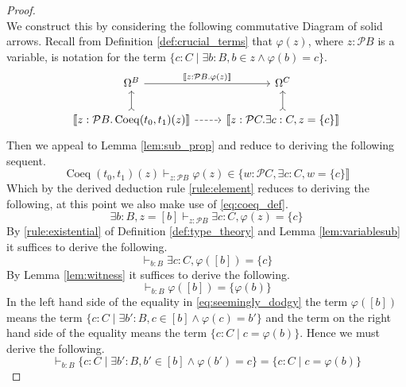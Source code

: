 \documentclass{tac}
\newcommand{\call}[1]{\mathcal{#1}}
\begin{document}
\begin{proof}
\begin{equation}
		\end{equation}
		We construct this by considering the following commutative Diagram of solid arrows. Recall from Definition \ref{def:crucial_terms} that $\varphi(z)$, where $z:\call{P}B$ is a variable, is notation for the term $\lbrace c:C \mid \exists b:B, b \in z \wedge \varphi(b) = c\rbrace$.
		\begin{equation}\label{eq:coeq_embedding}
			\begin{tikzcd}
				\Omega^B\arrow[r,"{\llbracket z:\call{P}B. \varphi(z)\rrbracket}"] & \Omega^C\\
				\llbracket z: \call{P}B . \operatorname{Coeq}(t_0,t_1)(z)\rrbracket\arrow[u,rightarrowtail]\arrow[r,dashed] & \llbracket z: \call{P}C. \exists c: C, z = \lbrace c \rbrace \rrbracket\arrow[u,rightarrowtail]
			\end{tikzcd}
		\end{equation}
		Then we appeal to Lemma \ref{lem:sub_prop} and reduce to deriving the following sequent.
		\begin{equation}
			\operatorname{Coeq}(t_0,t_1)(z)\vdash_{z:\call{P}B}\varphi(z) \in \lbrace w: \call{P}C, \exists c:C, w = \lbrace c \rbrace\rrbracket
		\end{equation}
		Which by the derived deduction rule \eqref{rule:element} reduces to deriving the following, at this point we also make use of \eqref{eq:coeq_def}.
		\begin{equation}
			\exists b:B, z = [b] \vdash_{z: \call{P}B}\exists c:C, \varphi(z) = \lbrace c \rbrace
		\end{equation}
		By \eqref{rule:existential} of Definition \ref{def:type_theory} and Lemma \ref{lem:variablesub} it suffices to derive the following.
		\begin{equation}
			\vdash_{b:B}\exists c:C, \varphi([b]) = \lbrace c \rbrace
		\end{equation}
		By Lemma \ref{lem:witness} it suffices to derive the following.
		\begin{equation}\label{eq:seemingly_dodgy}
			\vdash_{b:B}\varphi([b]) = \lbrace \varphi(b)\rbrace
		\end{equation}
		In the left hand side of the equality in \eqref{eq:seemingly_dodgy} the term $\varphi([b])$ means the term $\lbrace c:C \mid \exists b':B, c \in [b] \wedge \varphi(c) = b'\rbrace$ and the term on the right hand side of the equality means the term $\lbrace c :C \mid c = \varphi(b) \rbrace$. Hence we must derive the following.
		\begin{equation}
			\vdash_{b:B} \lbrace c:C \mid \exists b':B, b' \in [b] \wedge \varphi(b') = c\rbrace = \lbrace c :C \mid c = \varphi(b) \rbrace

\end{equation}
\end{proof}
\end{document}
